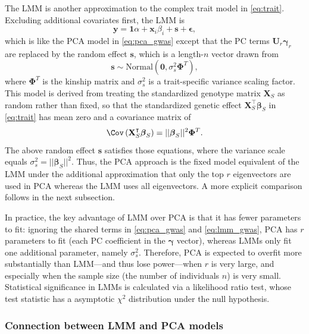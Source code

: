 \documentclass[11pt]{article}
\begin{document}
The LMM is another approximation to the complex trait model in \cref{eq:trait}.
Excluding additional covariates first, the LMM is
\begin{equation}
  \label{eq:lmm_gwas}
  \mathbf{y}
  =
  \mathbf{1} \alpha + \mathbf{x}_i \beta_i + \mathbf{s} + \boldsymbol{\epsilon}
  ,
\end{equation}
which is like the PCA model in \cref{eq:pca_gwas} except that the PC terms $\mathbf{U}_r \boldsymbol{\gamma}_r$ are replaced by the random effect $\mathbf{s}$, which is a length-$n$ vector drawn from \citep{sul_population_2018}
$$
\mathbf{s} \sim \text{Normal} \left( \mathbf{0}, \sigma^2_s \mathbf{\Phi}^T \right),
$$
where $\mathbf{\Phi}^T$ is the kinship matrix and $\sigma^2_s$ is a trait-specific variance scaling factor.
This model is derived from treating the standardized genotype matrix $\mathbf{X}_S$ as random rather than fixed, so that the standardized genetic effect
$\mathbf{X}_S^\intercal \boldsymbol{\beta}_S$
in \cref{eq:trait} has mean zero and a covariance matrix of
$$
\Cov \left( \mathbf{X}_S^\intercal \boldsymbol{\beta}_S \right)
=
|| \boldsymbol{\beta}_S ||^2 \mathbf{\Phi}^T
.
$$
The above random effect $\mathbf{s}$ satisfies those equations, where the variance scale equals $\sigma^2_s = || \boldsymbol{\beta}_S ||^2$.
Thus, the PCA approach is the fixed model equivalent of the LMM under the additional approximation that only the top $r$ eigenvectors are used in PCA whereas the LMM uses all eigenvectors.
A more explicit comparison follows in the next subsection.

In practice, the key advantage of LMM over PCA is that it has fewer parameters to fit: ignoring the shared terms in \cref{eq:pca_gwas} and \cref{eq:lmm_gwas}, PCA has $r$ parameters to fit (each PC coefficient in the $\boldsymbol{\gamma}$ vector), whereas LMMs only fit one additional parameter, namely $\sigma^2_s$.
Therefore, PCA is expected to overfit more substantially than LMM---and thus lose power---when $r$ is very large, and especially when the sample size (the number of individuals $n$) is very small.
Statistical significance in LMMs is calculated via a likelihood ratio test, whose test statistic has a asymptotic $\chi^2$ distribution under the null hypothesis.

\subsubsection{Connection between LMM and PCA models}
\end{document}

